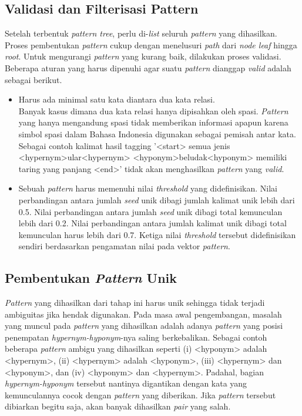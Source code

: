 \subsection{Validasi dan Filterisasi Pattern}
Setelah terbentuk \textit{pattern tree}, perlu di-\textit{list} seluruh \textit{pattern} yang dihasilkan. Proses pembentukan \textit{pattern} cukup dengan menelusuri \textit{path} dari \textit{\textit{node} leaf} hingga \textit{root}. Untuk mengurangi \textit{pattern} yang kurang baik, dilakukan proses validasi. Beberapa aturan yang harus dipenuhi agar suatu \textit{pattern} dianggap \textit{valid} adalah sebagai berikut.
\begin{itemize}
  \item Harus ada minimal satu kata diantara dua kata relasi. \\
  Banyak kasus dimana dua kata relasi hanya dipisahkan oleh spasi. \textit{Pattern} yang hanya mengandung spasi tidak memberikan informasi apapun karena simbol spasi dalam Bahasa Indonesia digunakan sebagai pemisah antar kata. Sebagai contoh kalimat hasil tagging '<start> semua jenis <hypernym>ular<hypernym> <hyponym>beludak<hyponym> memiliki taring yang panjang <end>' tidak akan menghasilkan \textit{pattern} yang \textit{valid}.
  \item Sebuah \textit{pattern} harus memenuhi nilai \textit{threshold} yang didefinisikan. Nilai perbandingan antara jumlah \textit{seed} unik dibagi jumlah kalimat unik lebih dari 0.5. Nilai perbandingan antara jumlah \textit{seed} unik dibagi total kemunculan lebih dari 0.2. Nilai perbandingan antara jumlah kalimat unik dibagi total kemunculan harus lebih dari 0.7. Ketiga nilai \textit{threshold} tersebut didefinisikan sendiri berdasarkan pengamatan nilai pada vektor \textit{pattern}.
\end{itemize}

\subsection{Pembentukan \textit{Pattern} Unik}
\textit{Pattern} yang dihasilkan dari tahap ini harus unik sehingga tidak terjadi ambiguitas jika hendak digunakan. Pada masa awal pengembangan, masalah yang muncul pada \textit{pattern} yang dihasilkan adalah adanya \textit{pattern} yang posisi penempatan \textit{hypernym-hyponym}-nya saling berkebalikan. Sebagai contoh beberapa \textit{pattern} ambigu yang dihasilkan seperti (i) <hyponym> adalah <hypernym>, (ii) <hypernym> adalah <hyponym>, (iii) <hypernym> dan <hyponym>, dan (iv) <hyponym> dan <hypernym>. Padahal, bagian \textit{hypernym-hyponym} tersebut nantinya digantikan dengan kata yang kemunculannya cocok dengan \textit{pattern} yang diberikan. Jika \textit{pattern} tersebut dibiarkan begitu saja, akan banyak dihasilkan \textit{pair} yang salah.

